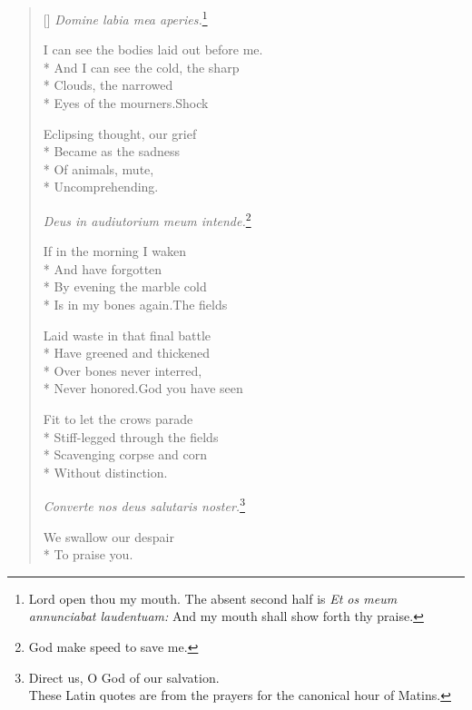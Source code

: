 \label{ch:lear_bt}
\settowidth{\versewidth}{Never honored.\qquad God you have seen}
\begin{verse}[\versewidth]
 \textit{Domine labia mea aperies.}\footnote{Lord open thou my mouth. The absent second half is \textit{Et os meum annunciabat laudentuam:} And my mouth shall show forth thy praise.}

I can see the bodies laid out before me.\\*
And I can see the cold, the sharp\\*
Clouds, the narrowed\\*
Eyes of the mourners.\qquad Shock

Eclipsing thought, our grief\\*
Became as the sadness\\*
Of animals, mute,\\*
Uncomprehending.

\textit{Deus in audiutorium meum intende.}\footnote{God make speed to save me.}

If in the morning I waken\\*
And have forgotten\\*
By evening the marble cold\\*
Is in my bones again.\qquad The fields

Laid waste in that final battle\\*
Have greened and thickened\\*
Over bones never interred,\\*
Never honored.\qquad God you have seen

Fit to let the crows parade\\*
Stiff-legged through the fields\\*
Scavenging corpse and corn\\*
Without distinction.

\textit{Converte nos deus salutaris noster.}\footnote{Direct us, O God of our salvation.\\ These Latin quotes are from the prayers for the canonical hour of Matins.}

We swallow our despair\\*
To praise you.


\end{verse}
